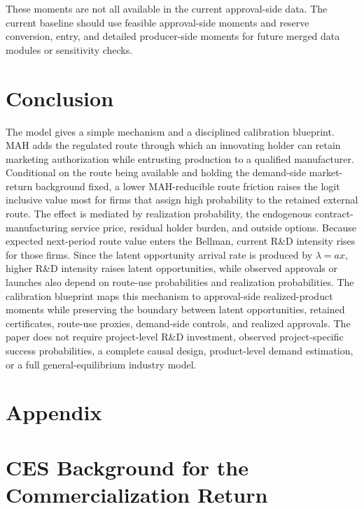 \documentclass[12pt]{article}
\newcommand{\1}{\mathbf{1}}
\begin{document}
These moments are not all available in the current approval-side data. The current baseline should use feasible approval-side moments and reserve conversion, entry, and detailed producer-side moments for future merged data modules or sensitivity checks.

\section{Conclusion}

The model gives a simple mechanism and a disciplined calibration blueprint. MAH adds the regulated route through which an innovating holder can retain marketing authorization while entrusting production to a qualified manufacturer. Conditional on the route being available and holding the demand-side market-return background fixed, a lower MAH-reducible route friction raises the logit inclusive value most for firms that assign high probability to the retained external route. The effect is mediated by realization probability, the endogenous contract-manufacturing service price, residual holder burden, and outside options. Because expected next-period route value enters the Bellman, current R\&D intensity rises for those firms. Since the latent opportunity arrival rate is produced by $\lambda=ax$, higher R\&D intensity raises latent opportunities, while observed approvals or launches also depend on route-use probabilities and realization probabilities. The calibration blueprint maps this mechanism to approval-side realized-product moments while preserving the boundary between latent opportunities, retained certificates, route-use proxies, demand-side controls, and realized approvals. The paper does not require project-level R\&D investment, observed project-specific success probabilities, a complete causal design, product-level demand estimation, or a full general-equilibrium industry model.


\clearpage



\section{Appendix}

\appendix
{}

\section{CES Background for the Commercialization Return}
\label{sec:ces_appendix}
\end{document}
